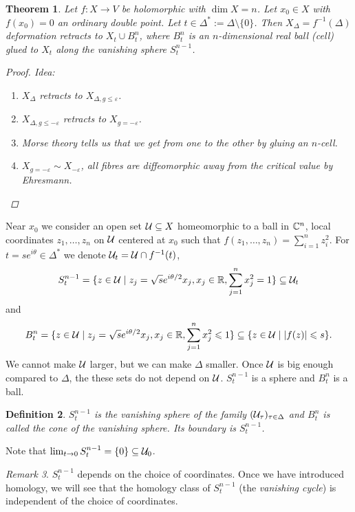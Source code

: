 \documentclass[A4paper, british, reqno]{amsart}
\theoremstyle{darkgreentheorem}
\newtheorem{thm}{Theorem}[section]
\theoremstyle{darkbluedefinition}
\newtheorem{defn}[thm]{Definition}
\theoremstyle{darkredexample}
\theoremstyle{remark}
\newtheorem{rem}[thm]{Remark}
\newcommand{\1}{\mathbbm{1}}
\newcommand{\sub}{\subseteq}
\begin{document}
\begin{thm}
    Let $f\colon X\to V$ be holomorphic with $\dim{X}=n$.
    Let $x_{0}\in X$ with $f(x_{0})=0$ an ordinary double point.
    Let $t\in \Delta^{*}:=\Delta\setminus \{0\}$.
    Then $X_{\Delta}=f^{-1}(\Delta)$ deformation retracts to $X_{t}\cup B_{t}^{n}$, where $B_{t}^{n}$ is an $n$-dimensional real ball (cell) glued to $X_{t}$ along the \textit{vanishing sphere} $S_{t}^{n-1}$.
    \begin{proof}
	Idea:
	\begin{enumerate}
	    \item $X_{\Delta}$ retracts to $X_{\Delta,g\leqslant \varepsilon}$.
	    \item $X_{\Delta,g\leqslant -\varepsilon}$ retracts to $X_{g=-\varepsilon}$.
	    \item Morse theory tells us that we get from one to the other by gluing an $n$-cell.
	    \item $X_{g=-\varepsilon}\sim X_{-\varepsilon}$, all fibres are diffeomorphic away from the critical value by Ehresmann.
	\end{enumerate}
    \end{proof}
\end{thm}

Near $x_{0}$ we consider an open set $\U\sub X$ homeomorphic to a ball in $\mathbb{C}^{n}$, local coordinates $z_{1},\ldots,z_{n}$ on $\mathcal{U}$ centered at $x_{0}$ such that $f(z_{1},\ldots,z_{n})=\sum_{i=1}^{n}z_{i}^{2}$.
For $t=se^{i\theta}\in \Delta^{*}$ we denote $\mathcal{U}_{t}=\mathcal{U}\cap f^{-1}(t)$,
\[ S_{t}^{n-1}=\{ z\in \U\mid z_{j}=\sqrt{s}e^{i\theta/2}x_{j}, x_{j}\in \R, \sum_{j=1}^{n}x_{j}^{2}=1 \}\sub \U_{t} \]
and
\[ B_{t}^{n}=\{ z\in \U \mid z_{j}=\sqrt{s}e^{i\theta/2}x_{j}, x_{j}\in \R, \sum_{j=1}^{n}x_{j}^{2}\leqslant 1 \}\sub \{ z\in \U\mid |f(z)|\leqslant s\}. \]
We cannot make $\mathcal{U}$ larger, but we can make $\Delta$ smaller.
Once $\mathcal{U}$ is big enough compared to $\Delta$, the these sets do not depend on $\mathcal{U}$.
$S_{t}^{n-1}$ is a sphere and $B_{t}^{n}$ is a ball.

\begin{defn}
    $S_{t}^{n-1}$ is the \textit{vanishing sphere} of the family $(\mathcal{U}_{\tau})_{\tau\in \Delta}$ and $B_{t}^{n}$ is called the \textit{cone of the vanishing sphere}.
    Its boundary is $S_{t}^{n-1}$.
\end{defn}
Note that $\lim_{t\to 0}S_{t}^{n-1}=\{0\}\sub \U_{0}$.

\begin{rem}
    $S_{t}^{n-1}$ depends on the choice of coordinates. 
    Once we have introduced homology, we will see that the homology class of $S_{t}^{n-1}$ (the \textit{vanishing cycle}) is independent of the choice of coordinates.
\end{rem}
\end{document}

